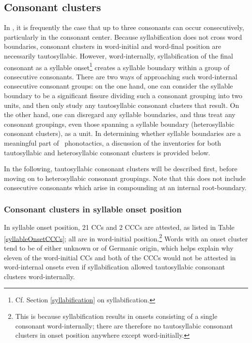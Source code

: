 \subsection{Consonant clusters}\label{CClusters}
In \PS, it is frequently the case that up to three consonants can occur consecutively, particularly in the consonant center. Because syllabification does not cross word boundaries, consonant clusters in word-initial and word-final position are necessarily tautosyllabic. However, word-internally, syllabification of the final consonant as a syllable onset\footnote{Cf. Section \ref{syllabification} on syllabification.} creates a syllable boundary within a group of consecutive consonants. There are two ways of approaching such word-internal consecutive consonant groups: on the one hand, one can consider the syllable boundary to be a significant fissure dividing such a consonant grouping into two units, and then only study any tautosyllabic consonant clusters that result. On the other hand, one can disregard any syllable boundaries, and thus treat any consonant groupings, even those spanning a syllable boundary (heterosyllabic consonant clusters), as a unit. 
In determining whether syllable boundaries are a meaningful part of \PS\ phonotactics, a discussion of the inventories for both tautosyllabic and heterosyllabic consonant clusters is provided below. 

In the following, tautosyllabic consonant clusters will be described first, before moving on to heterosyllabic consonant groupings. Note that this does not include consecutive consonants which arise in compounding at an internal root-boundary.


\subsubsection[CCs in onset position]{Consonant clusters in syllable onset position}
In syllable onset position, 21 CCs and 2 CCCs are attested, as listed in Table \vref{syllableOnsetCCCs}; %
all are in word-initial position.\footnote{This is because syllabification results in onsets consisting of a single consonant word-internally; there are therefore no tautosyllabic consonant clusters in onset position anywhere except word-initially.} 
Words with an onset cluster tend to be of either unknown or of Germanic origin, %
which helps explain why eleven of the word-initial CCs and both of the CCCs would not be attested in word-internal onsets even if syllabification allowed tautosyllabic consonant clusters word-internally. %

